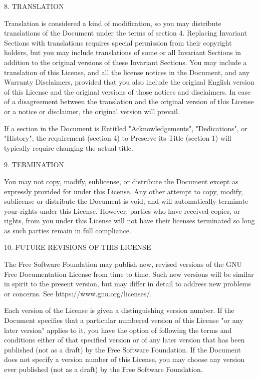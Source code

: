 \documentclass[oneside,english,a4paper,10pt,oneside,openany,final]{memoir}
\begin{document}
8. TRANSLATION

Translation is considered a kind of modification, so you may distribute translations of the Document under the terms of section 4. Replacing Invariant Sections with translations requires special permission from their copyright holders, but you may include translations of some or all Invariant Sections in addition to the original versions of these Invariant Sections. You may include a translation of this License, and all the license notices in the Document, and any Warranty Disclaimers, provided that you also include the original English version of this License and the original versions of those notices and disclaimers. In case of a disagreement between the translation and the original version of this License or a notice or disclaimer, the original version will prevail.

If a section in the Document is Entitled "Acknowledgements", "Dedications", or "History", the requirement (section 4) to Preserve its Title (section 1) will typically require changing the actual title.

9. TERMINATION

You may not copy, modify, sublicense, or distribute the Document except as expressly provided for under this License. Any other attempt to copy, modify, sublicense or distribute the Document is void, and will automatically terminate your rights under this License. However, parties who have received copies, or rights, from you under this License will not have their licenses terminated so long as such parties remain in full compliance.

10. FUTURE REVISIONS OF THIS LICENSE

The Free Software Foundation may publish new, revised versions of the GNU Free Documentation License from time to time. Such new versions will be similar in spirit to the present version, but may differ in detail to address new problems or concerns. See https://www.gnu.org/licenses/.

Each version of the License is given a distinguishing version number. If the Document specifies that a particular numbered version of this License "or any later version" applies to it, you have the option of following the terms and conditions either of that specified version or of any later version that has been published (not as a draft) by the Free Software Foundation. If the Document does not specify a version number of this License, you may choose any version ever published (not as a draft) by the Free Software Foundation. 
\end{document}

